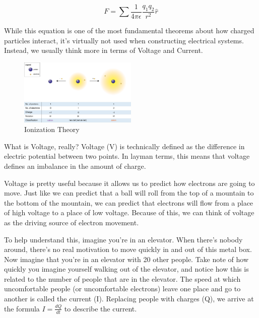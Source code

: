 \documentclass[a4paper]{article}
\begin{document}
\begin{equation} \label{eq:1}
F = \sum{\frac{1}{4\pi\epsilon}\frac{q_{1}q_{2}}{r^2}\hat{r}}
\end{equation}

\vspace{0.5cm}
While this equation is one of the most fundamental theorems about how charged particles interact, it's virtually not used when constructing electrical systems. Instead, we usually think more in terms of Voltage and Current.

\begin{figure}
  \begin{center}
    \includegraphics[width=0.5\textwidth]{ions_svg.png}
  \end{center}
  \caption{Ionization Theory}
\end{figure}

What is Voltage, really? Voltage (V) is technically defined as the difference in electric potential between two points. In layman terms, this means that voltage defines an imbalance in the amount of charge.

Voltage is pretty useful because it allows us to predict how electrons are going to move. Just like we can predict that a ball will roll from the top of a mountain to the bottom of the mountain, we can predict that electrons will flow from a place of high voltage to a place of low voltage. Because of this, we can think of voltage as the driving source of electron movement.

To help understand this, imagine you're in an elevator. When there's nobody around, there's no real motivation to move quickly in and out of this metal box. Now imagine that you're in an elevator with 20 other people. Take note of how quickly you imagine yourself walking out of the elevator, and notice how this is related to the number of people that are in the elevator. The speed at which uncomfortable people (or uncomfortable electrons) leave one place and go to another is called the current (I). Replacing people with charges (Q), we arrive at the formula $I = \frac{dQ}{dt}$ to describe the current.
\end{document}
